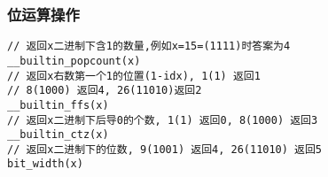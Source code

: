 \subsubsection{位运算操作}
\begin{lstlisting}
// 返回x二进制下含1的数量,例如x=15=(1111)时答案为4
__builtin_popcount(x)
// 返回x右数第一个1的位置(1-idx), 1(1) 返回1
// 8(1000) 返回4, 26(11010)返回2
__builtin_ffs(x)
// 返回x二进制下后导0的个数, 1(1) 返回0, 8(1000) 返回3
__builtin_ctz(x)
// 返回x二进制下的位数, 9(1001) 返回4, 26(11010) 返回5
bit_width(x)  
\end{lstlisting}